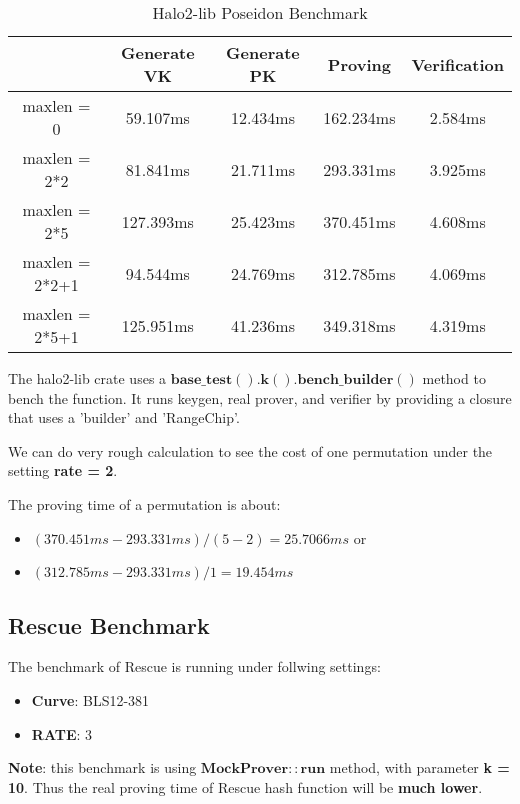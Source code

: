 \documentclass{article}
\begin{document}
\begin{table}[H]
    \centering
    \begin{tabular}{c|c|c|c|c} \hline
         &Generate VK& Generate PK & Proving &Verification \\ \hline
    maxlen = 0  & 59.107ms& 12.434ms & 162.234ms& 2.584ms \\ \hline
    maxlen = 2*2 &81.841ms& 21.711ms& 293.331ms& 3.925ms \\ \hline
    maxlen = 2*5 &127.393ms& 25.423ms& 370.451ms& 4.608ms \\ \hline
    maxlen = 2*2+1&94.544ms& 24.769ms& 312.785ms& 4.069ms \\ \hline
    maxlen = 2*5+1&125.951ms& 41.236ms& 349.318ms& 4.319ms \\ \hline
    \end{tabular}
    \caption{Halo2-lib Poseidon Benchmark}
    \label{tab:my_label}
\end{table}

The halo2-lib crate uses a $\mathbf{base\_test().k().bench\_builder()}$ method to bench the function. It runs keygen, real prover, and verifier by providing a closure that uses a 'builder' and 'RangeChip'.



We can do very rough calculation to see the cost of one permutation under the setting \textbf{rate = 2}.

The proving time of a permutation is about:
\begin{itemize}
    \item $(370.451ms - 293.331ms) / (5 - 2) = 25.7066ms$ or
    \item $(312.785ms - 293.331ms) / 1 = 19.454ms$
\end{itemize}


\subsection{Rescue Benchmark}

The benchmark of Rescue is running under follwing settings:

\begin{itemize}
    \item \textbf{Curve}: BLS12-381
    \item \textbf{RATE}: 3
\end{itemize}


\textbf{Note}: this benchmark is using $\mathbf{MockProver::run}$ method, with parameter \textbf{k = 10}. Thus the real proving time of Rescue hash function will be \textbf{much lower}.
\end{document}
